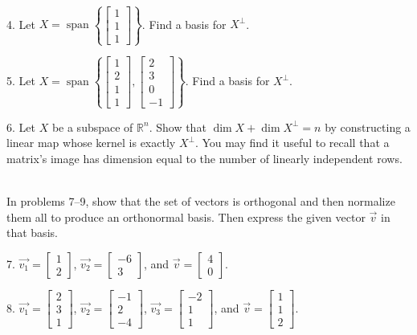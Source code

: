 \documentclass{article}
\begin{document}
~\\

4. Let $X = \operatorname{span} \left\{ \left[\begin{array}{c} 1 \\ 1 \\ 1 \end{array}\right] \right\}$. Find a basis for $X^\perp$.

5. Let $X = \operatorname{span} \left\{ \left[\begin{array}{c} 1 \\ 2 \\ 1 \\ 1 \end{array}\right], \left[\begin{array}{c} 2 \\ 3 \\ 0 \\ -1 \end{array}\right] \right\}$. Find a basis for $X^\perp$.

6. Let $X$ be a subspace of $\mathbb{R}^n$. Show that $\dim X + \dim X^\perp = n$ by constructing a linear map whose kernel is exactly $X^\perp$. You may find it useful to recall that a matrix's image has dimension equal to the number of linearly independent rows.

~\\

In problems 7--9, show that the set of vectors is orthogonal and then normalize them all to produce an orthonormal basis. Then express the given vector $\vec{v}$ in that basis.

7. $\vec{v_1} = \left[\begin{array}{c} 1 \\ 2 \end{array}\right]$, $\vec{v_2} = \left[\begin{array}{c} -6 \\ 3 \end{array}\right]$, and $\vec{v} = \left[\begin{array}{c} 4 \\ 0 \end{array}\right]$.

8. $\vec{v_1} = \left[\begin{array}{c} 2 \\ 3 \\ 1 \end{array}\right]$, $\vec{v_2} = \left[\begin{array}{c} -1 \\ 2 \\ -4 \end{array}\right]$, $\vec{v_3} = \left[\begin{array}{c} -2 \\ 1 \\ 1 \end{array}\right]$, and $\vec{v} = \left[\begin{array}{c} 1 \\ 1 \\ 2 \end{array}\right]$.
\end{document}

